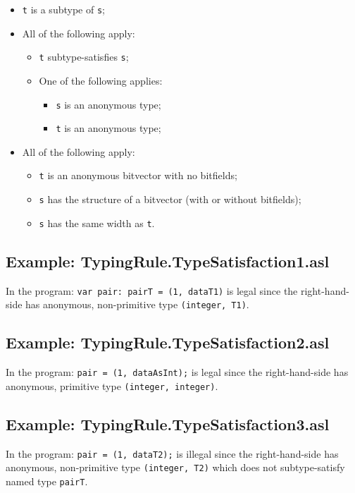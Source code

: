 \documentclass{book}
\begin{document}
 \begin{itemize}
 \item \texttt{t} is a subtype of \texttt{s};
 \item All of the following apply:
    \begin{itemize}
    \item \texttt{t} subtype-satisfies \texttt{s};
    \item One of the following applies:
      \begin{itemize}
      \item \texttt{s} is an anonymous type;
      \item \texttt{t} is an anonymous type;
      \end{itemize}
    \end{itemize}
  \item All of the following apply:
    \begin{itemize}
    \item \texttt{t} is an anonymous bitvector with no bitfields;
    \item \texttt{s} has the structure of a bitvector (with or without bitfields);
    \item \texttt{s} has the same width as \texttt{t}.
    \end{itemize}
  \end{itemize}

\subsection{Example: TypingRule.TypeSatisfaction1.asl}
    In the program:
    \texttt{var pair: pairT = (1, dataT1)} is legal since the right-hand-side has
    anonymous, non-primitive type \texttt{(integer, T1)}.

\subsection{Example: TypingRule.TypeSatisfaction2.asl}
    In the program:
    \texttt{pair = (1, dataAsInt);} is legal since the right-hand-side has anonymous,
    primitive type \texttt{(integer, integer)}.

\subsection{Example: TypingRule.TypeSatisfaction3.asl}
    In the program:
    \texttt{pair = (1, dataT2);} is illegal since the right-hand-side has anonymous,
    non-primitive type \texttt{(integer, T2)} which does not subtype-satisfy named
    type \texttt{pairT}.
\end{document}
